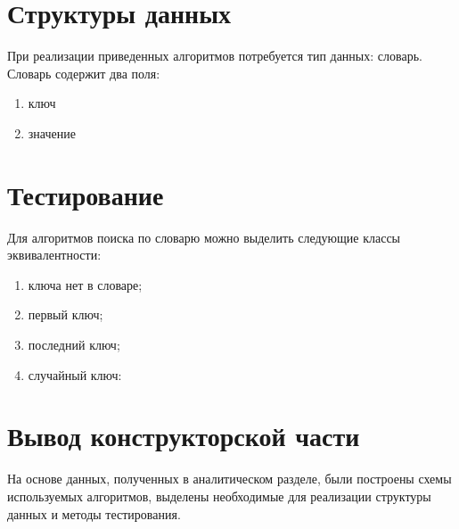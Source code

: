 \section{Структуры данных}\label{Structs}

При реализации приведенных алгоритмов потребуется тип данных: словарь. Словарь содержит два поля:

\begin{enumerate}
  \item ключ 
  \item значение
\end{enumerate}

\section{Тестирование}\label{Testing}


Для алгоритмов поиска по словарю можно выделить следующие классы эквивалентности:

\begin{enumerate}
    \item ключа нет в словаре;
    \item первый ключ;
    \item последний ключ;
    \item случайный ключ:
\end{enumerate}




\section{Вывод конструкторской части}\label{KonstructResult}
На основе данных, полученных в аналитическом разделе, были построены схемы используемых алгоритмов,
выделены необходимые для реализации структуры данных и методы тестирования.

